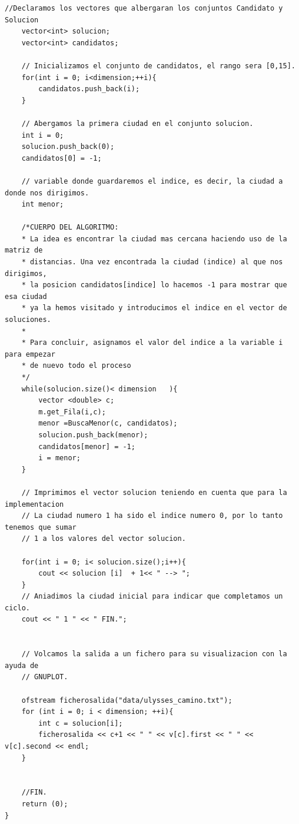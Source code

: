 \documentclass[11pt,a4paper]{article} %
\begin{document}
\begin{lstlisting}[style=C++]
	//Declaramos los vectores que albergaran los conjuntos Candidato y Solucion
	vector<int> solucion;
	vector<int> candidatos;
	
	// Inicializamos el conjunto de candidatos, el rango sera [0,15]. 
	for(int i = 0; i<dimension;++i){
		candidatos.push_back(i);
	}
	
	// Abergamos la primera ciudad en el conjunto solucion.
	int i = 0;
	solucion.push_back(0);
	candidatos[0] = -1;
	
	// variable donde guardaremos el indice, es decir, la ciudad a donde nos dirigimos.
	int menor;
	
	/*CUERPO DEL ALGORITMO:
	* La idea es encontrar la ciudad mas cercana haciendo uso de la matriz de
	* distancias. Una vez encontrada la ciudad (indice) al que nos dirigimos,
	* la posicion candidatos[indice] lo hacemos -1 para mostrar que esa ciudad
	* ya la hemos visitado y introducimos el indice en el vector de soluciones.
	* 
	* Para concluir, asignamos el valor del indice a la variable i para empezar
	* de nuevo todo el proceso
	*/
	while(solucion.size()< dimension   ){
		vector <double> c;
		m.get_Fila(i,c);
		menor =BuscaMenor(c, candidatos);
		solucion.push_back(menor);
		candidatos[menor] = -1;
		i = menor;
	}
	
	// Imprimimos el vector solucion teniendo en cuenta que para la implementacion
	// La ciudad numero 1 ha sido el indice numero 0, por lo tanto tenemos que sumar
	// 1 a los valores del vector solucion.
	
	for(int i = 0; i< solucion.size();i++){
		cout << solucion [i]  + 1<< " --> ";
	}
	// Aniadimos la ciudad inicial para indicar que completamos un ciclo.
	cout << " 1 " << " FIN.";
	
	
	// Volcamos la salida a un fichero para su visualizacion con la ayuda de 
	// GNUPLOT.
	
	ofstream ficherosalida("data/ulysses_camino.txt");
	for (int i = 0; i < dimension; ++i){
		int c = solucion[i];
		ficherosalida << c+1 << " " << v[c].first << " " << v[c].second << endl;
	}
	
	
	//FIN.
	return (0);
}
\end{lstlisting} 

\newpage
\end{document}

